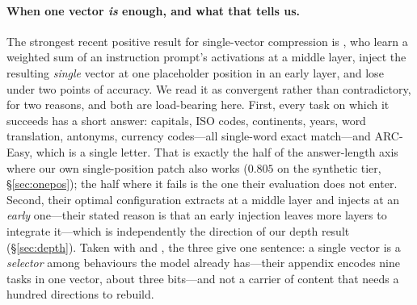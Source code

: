\documentclass{article}
\begin{document}
\paragraph{When one vector \emph{is} enough, and what that tells us.}
The strongest recent positive result for single-vector compression is
\citet{ardoin2026promptcompression}, who learn a weighted sum of an instruction
prompt's activations at a middle layer, inject the resulting \emph{single}
vector at one placeholder position in an early layer, and lose under two points
of accuracy. We read it as convergent rather than contradictory, for two
reasons, and both are load-bearing here. First, every task on which it succeeds
has a short answer: capitals, ISO codes, continents, years, word translation,
antonyms, currency codes---all single-word exact match---and ARC-Easy, which is
a single letter. That is exactly the half of the answer-length axis where our
own single-position patch also works ($0.805$ on the synthetic tier,
\S\ref{sec:onepos}); the half where it fails is the one their evaluation does
not enter. Second, their optimal configuration extracts at a middle layer and
injects at an \emph{early} one---their stated reason is that an early injection
leaves more layers to integrate it---which is independently the direction of our
depth result (\S\ref{sec:depth}). Taken with \citet{dong2026taskvectorlimits}
and \citet{wiegreffe2025mcq}, the three give one sentence: a single vector is a
\emph{selector} among behaviours the model already has---their appendix encodes
nine tasks in one vector, about three bits---and not a carrier of content that
needs a hundred directions to rebuild.
\end{document}
